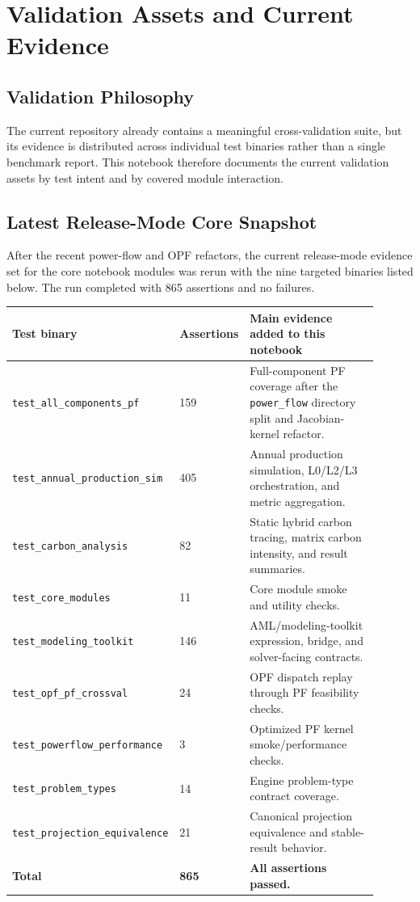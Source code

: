 \section{Validation Assets and Current Evidence}

\subsection{Validation Philosophy}

The current repository already contains a meaningful cross-validation suite, but
its evidence is distributed across individual test binaries rather than a single
benchmark report.  This notebook therefore documents the current validation
assets by test intent and by covered module interaction.

\subsection{Latest Release-Mode Core Snapshot}

After the recent power-flow and OPF refactors, the current release-mode evidence
set for the core notebook modules was rerun with the nine targeted binaries
listed below.  The run completed with 865 assertions and no failures.

\begin{longtable}{@{}L{0.32\linewidth}L{0.16\linewidth}L{0.42\linewidth}@{}}
\toprule
Test binary & Assertions & Main evidence added to this notebook \\
\midrule
\endhead
\texttt{test\_all\_components\_pf} & 159 & Full-component PF coverage after the \texttt{power\_flow} directory split and Jacobian-kernel refactor. \\
\texttt{test\_annual\_production\_sim} & 405 & Annual production simulation, L0/L2/L3 orchestration, and metric aggregation. \\
\texttt{test\_carbon\_analysis} & 82 & Static hybrid carbon tracing, matrix carbon intensity, and result summaries. \\
\texttt{test\_core\_modules} & 11 & Core module smoke and utility checks. \\
\texttt{test\_modeling\_toolkit} & 146 & AML/modeling-toolkit expression, bridge, and solver-facing contracts. \\
\texttt{test\_opf\_pf\_crossval} & 24 & OPF dispatch replay through PF feasibility checks. \\
\texttt{test\_powerflow\_performance} & 3 & Optimized PF kernel smoke/performance checks. \\
\texttt{test\_problem\_types} & 14 & Engine problem-type contract coverage. \\
\texttt{test\_projection\_equivalence} & 21 & Canonical projection equivalence and stable-result behavior. \\
\textbf{Total} & \textbf{865} & \textbf{All assertions passed.} \\
\bottomrule
\end{longtable}

